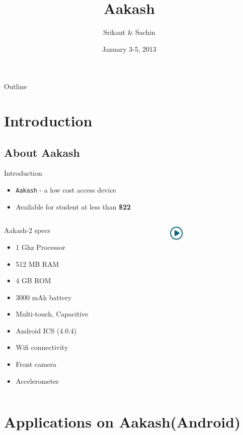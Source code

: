 \documentclass{beamer}
\title[Aakash]{Aakash}
\author{Srikant \& Sachin}
\institute{Indian Institute of Technology, Bombay}
\date{January 3-5, 2013}
\begin{document}
\begin{frame}
  \titlepage
\end{frame}
\begin{frame}{Outline}
 \tableofcontents
\end{frame}
\section{Introduction}
\subsection{About Aakash}
\begin{frame}{Introduction}
\begin{itemize}
  \item {\tt Aakash} - a low cost access device
  \item Available for student at less than {\bf \$22}
\end{itemize}
\begin{columns}
\begin{column}{.48\textwidth}
\begin{block}{Aakash-2 specs}
\begin{itemize}
  \item 1 Ghz Processor
  \item 512 MB RAM
  \item 4 GB ROM
  \item 3000 mAh battery
  \item Multi-touch, Capacitive
  \item Android ICS (4.0.4) 
  \item Wifi connectivity
  \item Front camera
  \item Accelerometer
\end{itemize}
\end{block}
\end{column}%
\begin{column}{.20\textwidth}
  \centerline{\href{file:///home/sachin/github/slides/techfest2013/android_app.3gp}{\includegraphics[height=0.8cm,width=0.8cm]{play.jpg}}}
\end{column}%
\end{columns}
\end{frame}
\section{Applications on Aakash(Android)}
\end{document}
